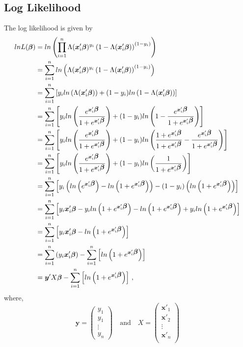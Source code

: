 \documentclass{article}
\newcommand{\bbeta}{\mbox{\boldmath $\beta$}}
\begin{document}
\subsection*{Log Likelihood}
The log likelihood is given by
\begin{align*}
lnL(\bbeta)&=ln\left(\prod_{i=1}^n \Lambda({{\bm x'_i}\bbeta})^{y_i}\left(1-\Lambda({{\bm x'_i}\bbeta})\right)^{(1-y_i)}\right)\\
&=\sum_{i=1}^nln\left( \Lambda({{\bm x'_i}\bbeta})^{y_i}\left(1-\Lambda({{\bm x'_i}\bbeta})\right)^{(1-y_i)}\right)\\
&=\sum_{i=1}^n\left[ y_i ln\left( \Lambda({{\bm x'_i}\bbeta})\right)+(1-y_i)ln\left(1-\Lambda({{\bm x'_i}\bbeta})\right)\right]\\
&=\sum_{i=1}^n\left[ y_i ln\left(\frac{e^{{\bm x'_i}\bbeta}}{1+e^{{\bm x'_i}\bbeta}}\right)+(1-y_i)ln\left(
1-\frac{e^{{\bm x'_i}\bbeta}}{1+e^{{\bm x'_i}\bbeta}}
\right)\right]\\
&=\sum_{i=1}^n\left[ y_i ln\left(\frac{e^{{\bm x'_i}\bbeta}}{1+e^{{\bm x'_i}\bbeta}}\right)+(1-y_i)ln\left(
\frac{1+e^{{\bm x'_i}\bbeta}}{1+e^{{\bm x'_i}\bbeta}}-\frac{e^{{\bm x'_i}\bbeta}}{1+e^{{\bm x'_i}\bbeta}}
\right)\right]\\
&=\sum_{i=1}^n\left[ y_i ln\left(\frac{e^{{\bm x'_i}\bbeta}}{1+e^{{\bm x'_i}\bbeta}}\right)+(1-y_i)ln\left(
\frac{1}{1+e^{{\bm x'_i}\bbeta}}
\right)\right]\\
&=\sum_{i=1}^n\left[
y_i\left(
ln\left(e^{{\bm x'_i}\bbeta}\right)
-ln\left(1+e^{{\bm x'_i}\bbeta}\right)
\right)
-(1-y_i)\left(
ln\left(1+e^{{\bm x'_i}\bbeta}\right)
\right)
\right]\\
&=\sum_{i=1}^n\left[
y_i{{\bm x'_i}\bbeta}
-y_iln\left(1+e^{{\bm x'_i}\bbeta}\right)
-ln\left(1+e^{{\bm x'_i}\bbeta}\right)
+y_iln\left(1+e^{{\bm x'_i}\bbeta}\right)
\right]\\
&=\sum_{i=1}^n\left[
y_i{{\bm x'_i}\bbeta}
-ln\left(1+e^{{\bm x'_i}\bbeta}\right)
\right]\\
&=\sum_{i=1}^n\left(
y_i{{{\bm x'_i}\bbeta}}
\right)
-\sum_{i=1}^n\left[
ln\left(1+e^{{{\bm x'_i}\bbeta}}\right)
\right]\\
&={\bm y}'X\bbeta
-\sum_{i=1}^n\left[
ln\left(1+e^{{{\bm x'_i}\bbeta}}\right)
\right]\,,
\end{align*}
where,
\begin{equation}
{\bm y}=\left(
\begin{array}{c}
y_1\\
y_1\\
\vdots\\
y_n
\end{array}
\right)
\quad\mbox{and}\quad
X=\left(
\begin{array}{c}
{\bm x'_1}\\
{\bm x'_2}\\
\vdots\\
{\bm x'_n}\\
\end{array}
\right)
\end{equation}
\end{document}
